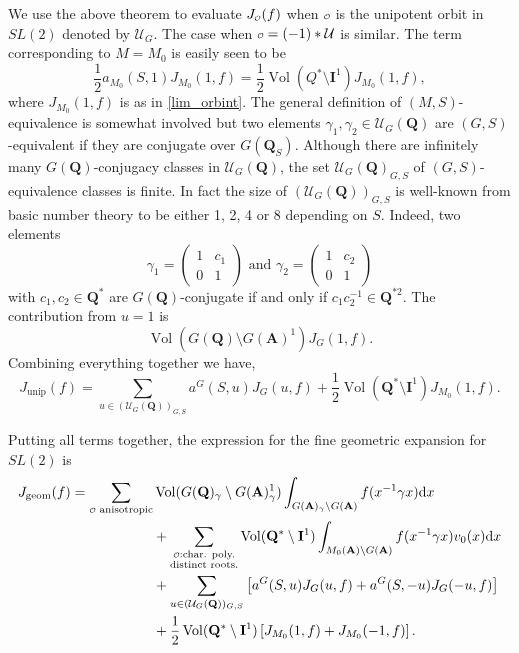\documentclass{ims9x6}
\def\A{\mathbf A}
\def\I{\mathbf I}
\def\Q{\mathbf Q}
\def\o{\scalebox{0.7}{$\scriptstyle\mathcal{O}$}}
\def\UUU{\mathcal U}
\def\d{\text d}
\def\bs{\setminus}
\def\vol{\operatorname{Vol}}
\begin{document}
We use the above theorem to evaluate $J_{\o}(f)$ when $\o$ is the unipotent orbit in $SL(2)$ denoted by $\UUU_G$. The case when $\o = (-1)*\UUU$ is similar. The term corresponding to $M=M_0$ is easily seen to be 
\[ \frac{1}{2} a_{M_0}(S, 1) J_{M_0}(1, f) = \frac{1}{2} \vol(Q^*\bs \I^1) J_{M_0}(1, f), \]
where $J_{M_0}(1, f)$ is as in \cref{lim_orbint}. The general definition of $(M, S)$-equivalence is somewhat involved but two elements $\gamma_1, \gamma_2 \in \UUU_G(\Q)$ are $(G, S)$-equivalent if they are conjugate over $G(\Q_S)$. Although there are infinitely many $G(\Q)$-conjugacy classes in $\UUU_G(\Q)$, the set $\UUU_G(\Q)_{G, S}$ of $(G, S)$-equivalence classes is finite. In fact the size of $(\UUU_G(\Q))_{G, S}$ is well-known from basic number theory to be either 1, 2, 4 or 8 depending on $S$. Indeed, two elements
\[ \gamma_1 = \begin{pmatrix} 1 & c_1 \\ 0 & 1 \end{pmatrix} \text{ and } \gamma_2 = \begin{pmatrix} 1 & c_2 \\ 0 & 1 \end{pmatrix}
\]
with $c_1, c_2 \in \Q^*$ are $G(\Q)$-conjugate if and only if $c_1 c_2^{-1} \in \Q^{*2}$. The contribution from $u=1$ is 
\[ \vol(G(\Q)\bs G(\A)^1) J_G(1, f). \]
Combining everything together we have, 
\[ J_{\text{unip}}(f) = \sum_{u \in (\UUU_G(\Q))_{G, S}} a^G(S, u) J_G(u, f) + \frac{1}{2} \vol(\Q^*\bs \I^1) J_{M_0}(1, f). \]

Putting all terms together, the expression for the fine geometric expansion for $SL(2)$ is
\begin{equation} \label{eq:fine_geom}
	\begin{aligned}
		J_{\text{geom}}(f) = \sum_{\o \text{ anisotropic}} & \vol(G(\Q)_\gamma \bs G(\A)^1_\gamma) 
					\int_{G(\A)_\gamma \bs G(\A)} f(x^{-1} \gamma x) \d x \\
			& + \sum_{\substack{\o : \text{char. poly.} \\ \text{distinct roots.}}} \vol(\Q^*\bs \I^1) 
					\int_{M_0(\A)\bs G(\A)} f(x^{-1}\gamma x) v_0(x) \d x \\
			& + \sum_{u \in (\UUU_G(\Q))_{G, S}} \left[ a^G(S, u) J_G(u, f) + a^G(S, -u) J_G(-u, f) 
					\right] \\
			& + \frac{1}{2} \vol(\Q^*\bs \I^1) \left[ J_{M_0}(1, f) + J_{M_0}(-1, f) 
					\right]. 
	\end{aligned}
\end{equation}
\end{document}
